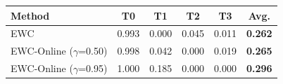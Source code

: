 \begin{tabular}{lcccc|c}
\toprule
Method & T0 & T1 & T2 & T3 & \textbf{Avg.} \\
\midrule
EWC & 0.993 & 0.000 & 0.045 & 0.011 & \textbf{0.262} \\
EWC-Online ($\gamma$=0.50) & 0.998 & 0.042 & 0.000 & 0.019 & \textbf{0.265} \\
EWC-Online ($\gamma$=0.95) & 1.000 & 0.185 & 0.000 & 0.000 & \textbf{0.296} \\
\bottomrule
\end{tabular}